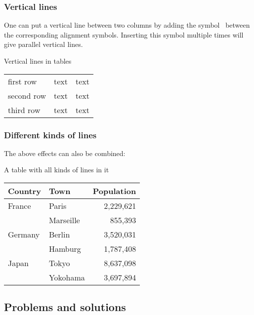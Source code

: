 \subsubsection{Vertical lines}

One can put a vertical line between two columns by adding the symbol~\optname{|} between the corresponding alignment symbols.
Inserting this symbol multiple times will give parallel vertical lines.
\begin{showlatex}{Vertical lines in tables}
\begin{tabular}{l||c|c}
  first row   & text & text \\
  second row  & text & text \\
  third row   & text & text
\end{tabular}
\end{showlatex}

\subsubsection{Different kinds of lines}

The above effects can also be combined:
\begin{showlatex}{A table with all kinds of lines in it}
\begin{tabular}{|l||l|r|}
  \hline
  \textbf{Country}  &  \textbf{Town}  & \textbf{Population} \\
  \hline\hline
  France            & Paris           & 2,229,621           \\
  \cline{2-3}
  {}                & Marseille       &   855,393           \\
  \hline
  Germany           & Berlin          & 3,520,031           \\
  \cline{2-3}
  {}                & Hamburg         & 1,787,408           \\
  \hline
  Japan             & Tokyo           & 8,637,098           \\
  \cline{2-3}
  {}                & Yokohama        & 3,697,894           \\
  \hline
\end{tabular}
\end{showlatex}



\subsection{Problems and solutions}

